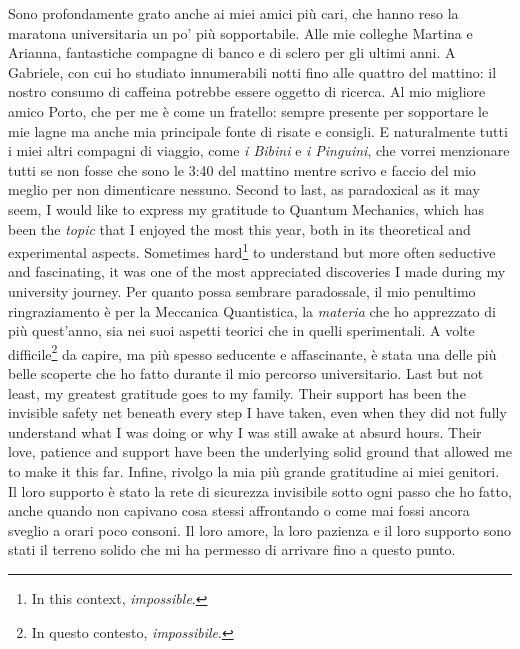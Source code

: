 \begin{paracol}{2}
    \switchcolumn
    Sono profondamente grato anche ai miei amici più cari, che hanno reso la maratona universitaria un po' più sopportabile. Alle mie colleghe Martina e Arianna, fantastiche compagne di banco e di sclero per gli ultimi anni. A Gabriele, con cui ho studiato innumerabili notti fino alle quattro del mattino: il nostro consumo di caffeina potrebbe essere oggetto di ricerca. Al mio migliore amico Porto, che per me è come un fratello: sempre presente per sopportare le mie lagne ma anche mia principale fonte di risate e consigli. E naturalmente tutti i miei altri compagni di viaggio, come \emph{i Bibini} e \emph{i Pinguini}, che vorrei menzionare tutti se non fosse che sono le 3:40 del mattino mentre scrivo e faccio del mio meglio per non dimenticare nessuno.
    \switchcolumn*
    Second to last, as paradoxical as it may seem, I would like to express my gratitude to Quantum Mechanics, which has been the \emph{topic} that I enjoyed the most this year, both in its theoretical and experimental aspects. Sometimes hard\footnote{In this context, \emph{impossible}.} to understand but more often seductive and fascinating, it was one of the most appreciated discoveries I made during my university journey.
    \switchcolumn
    Per quanto possa sembrare paradossale, il mio penultimo ringraziamento è per la Meccanica Quantistica, la \emph{materia} che ho apprezzato di più quest'anno, sia nei suoi aspetti teorici che in quelli sperimentali. A volte difficile\footnote{In questo contesto, \emph{impossibile}.} da capire, ma più spesso seducente e affascinante, è stata una delle più belle scoperte che ho fatto durante il mio percorso universitario.
    \switchcolumn*
    Last but not least, my greatest gratitude goes to my family. Their support has been the invisible safety net beneath every step I have taken, even when they did not fully understand what I was doing or why I was still awake at absurd hours. Their love, patience and support have been the underlying solid ground that allowed me to make it this far.
    \switchcolumn
    Infine, rivolgo la mia più grande gratitudine ai miei genitori. Il loro supporto è stato la rete di sicurezza invisibile sotto ogni passo che ho fatto, anche quando non capivano cosa stessi affrontando o come mai fossi ancora sveglio a orari poco consoni. Il loro amore, la loro pazienza e il loro supporto sono stati il terreno solido che mi ha permesso di arrivare fino a questo punto.
\end{paracol}